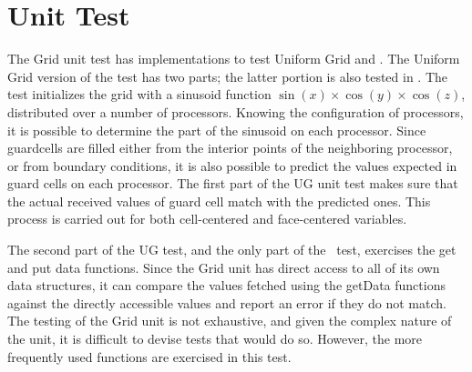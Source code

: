\section{Unit Test}

The \unit{Grid} unit test has implementations to test  Uniform Grid
and \Paramesh. The Uniform Grid version of the test has two parts; the
latter portion is also tested in \Paramesh.
The test initializes the grid with a sinusoid function
\(\sin(x)\times\cos(y)\times\cos(z)\), distributed over a number of
processors. Knowing the configuration of processors, it is possible to
determine the part of the sinusoid on each processor. Since guardcells
are filled either from the interior points of the neighboring
processor, or from boundary conditions, it is also possible to predict
the values expected in guard cells on each processor. The first part of
the UG unit test makes sure that the actual received values of guard
cell match with the predicted ones. This process is carried out for
both cell-centered and face-centered variables.

The second part of the UG test, and the only part of the \Paramesh\ test,
exercises the get and put data functions. Since the \unit{Grid} unit
has direct access to all of its own data structures, it can compare
the values fetched using the getData functions against the directly
accessible values and report an error if they do not match.
The testing of the \unit{Grid} unit is not exhaustive, and given the complex
nature of the unit, it is difficult to devise tests that would do
so. However, the more frequently used functions are exercised in this test.


